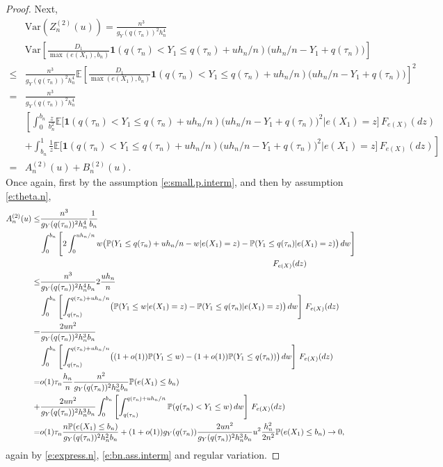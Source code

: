 \documentclass[12pt]{amsart}
\newcommand{\LFe}{F_{e(X)}}
\newcommand{\1}{\mathbbm{1}}
\newcommand{\0}{\mathbf{0}}
\newcommand{\one}{\mathbf{1}}
\newcommand{\E}{\mathbb{E}}
\newcommand{\var}{\mathrm{Var}}
\theoremstyle{plain}
\theoremstyle{definition}
\newcommand{\bbP}{\mathbb{P}}
\begin{document}
\begin{proof}
Next,
\begin{align*}
&\var(Z_n^{(2)}(u)) = \frac{n^3}{g_Y(q(\tau_n))^2h_n^4}\\
&\var\left[   \frac{D_1}{\max(e(X_1),b_n)} \one
  (q(\tau_n)<Y_1\leq q(\tau_n)+uh_n/n) \bigl( uh_n/n-Y_1+q(\tau_n)\bigr)\right] \\
\leq& \frac{n^3}{g_Y(q(\tau_n))^2h_n^4}\E\left[   \frac{D_1}{\max(e(X_1),b_n)} \one
  (q(\tau_n)<Y_1\leq q(\tau_n)+uh_n/n) \bigl( uh_n/n-Y_1+q(\tau_n)\bigr)\right]^2 \\
=& \frac{n^3}{g_Y(q(\tau_n))^2h_n^4} \\
&\left[       \int_0^{b_n} \frac{z}{b_n^2} \E\bigl[  \one
  (q(\tau_n)<Y_1\leq q(\tau_n)+uh_n/n) \bigl( uh_n/n-Y_1+q(\tau_n))^2
   \big| e(X_1)=z\bigr]\, \LFe(dz)  \right. \\
  &\left.  + \int_{b_n}^1  \frac1z \E\bigl[  \one
  (q(\tau_n)<Y_1\leq q(\tau_n)+uh_n/n) \bigl( uh_n/n-Y_1+q(\tau_n))^2
   \big| e(X_1)=z\bigr]\, \LFe(dz) 
\right] \\
=& A_n^{(2)}(u) +B_n^{(2)}(u). 
\end{align*}
%
Once again, first  by the assumption \eqref{e:small.p.interm}, and
then by assumption \eqref{e:theta.n}, 
%
\begin{align*}
A_n^{(2)}(u) \leq& \frac{n^3}{g_Y(q(\tau_n))^2h_n^4}  \frac{1}{b_n}\\
&\int_0^{b_n} \left[ 2\int_0^{uh_n/n} w \bigl( \bbP(Y_1\leq
  q(\tau_n)+uh_n/n-w|e(X_1)=z)-\bbP(Y_1\leq q(\tau_n)|e(X_1)=z)\bigr)\, dw\right]\\
&\hskip 4in  \LFe(dz) \\
\leq& \frac{n^3}{g_Y(q(\tau_n))^2h_n^4b_n} 2\frac{uh_n}{n} \\
&\int_0^{b_n} \left[
  \int_{q(\tau_n)}^{q(\tau_n)+uh_n/n} \bigl( \bbP(Y_1\leq
  w|e(X_1)=z)-\bbP(Y_1\leq q(\tau_n)|e(X_1)=z)\bigr)\, dw\right]\, \LFe(dz) \\
=& \frac{2un^2}{g_Y(q(\tau_n))^2h_n^3b_n}  \\
&\int_0^{b_n} \left[
  \int_{q(\tau_n)}^{q(\tau_n)+uh_n/n} \bigl( (1+o(1))\bbP(Y_1\leq
  w)-(1+o(1))\bbP(Y_1\leq q(\tau_n))\bigr)\, dw\right]\, \LFe(dz) \\
=&o(1)\tau_n \frac{h_n}{n}\frac{n^2}{g_Y(q(\tau_n))^2h_n^3b_n}\bbP(e(X_1)\leq b_n)\\
+&   \frac{2un^2}{g_Y(q(\tau_n))^2h_n^3b_n} 
\int_0^{b_n} \left[
  \int_{q(\tau_n)}^{q(\tau_n)+uh_n/n}  \bbP(q(\tau_n)<Y_1\leq
  w) \, dw\right]\, \LFe(dz)\\
=& o(1)\tau_n  \frac{n\bbP(e(X_1)\leq b_n)}{g_Y(q(\tau_n))^2h_n^2b_n}
+  (1+o(1)) g_Y(q(\tau_n))\frac{2un^2}{g_Y(q(\tau_n))^2h_n^3b_n} 
  u^2\frac{h_n^2}{2n^2} \bbP(e(X_1)\leq b_n)\to 0,
\end{align*}
%
again by \eqref{e:express.n}, \eqref{e:bn.ass.interm} and regular
variation.


\end{proof}
\end{document}
